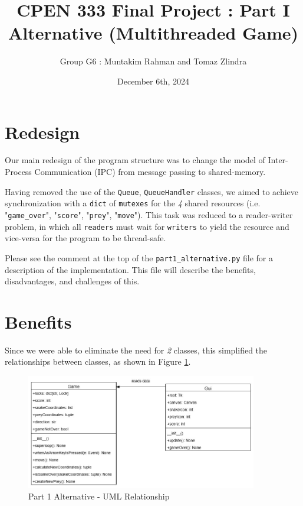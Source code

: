 \documentclass{article}
\title{CPEN 333 Final Project : Part I Alternative (Multithreaded Game)}
\author{Group G6 : Muntakim Rahman and Tomaz Zlindra}
\date{December 6th, 2024}
\begin{document}
\maketitle

\section{Redesign}
Our main redesign of the program structure was to change the model of Inter-Process Communication (IPC) from message passing to shared-memory.

Having removed the use of the \texttt{Queue}, \texttt{QueueHandler} classes, we aimed to achieve synchronization with a \texttt{dict} of \texttt{mutexes} for
the \textit{4} shared resources (i.e. "\texttt{game\_over}", "\texttt{score}", "\texttt{prey}", "\texttt{move}"). This task was reduced to a reader-writer problem, in which all \texttt{readers}
must wait for \texttt{writers} to yield the resource and vice-versa for the program to be thread-safe.

Please see the comment at the top of the \texttt{part1\_alternative.py} file for a description of the implementation. This file will describe the benefits, disadvantages, and challenges of this.

\section{Benefits}

Since we were able to eliminate the need for \textit{2} classes, this simplified the relationships between classes,
as shown in Figure \ref{fig:Part1_Alternative_ClassDiagrams}. \\

\begin{figure}[H]
    \centering
    \includegraphics[width=0.9\textwidth]{../Part_1_Alternative_ClassDiagrams.jpg}
    \caption{Part 1 Alternative - UML Relationship}
    \label{fig:Part1_Alternative_ClassDiagrams}
\end{figure}
\end{document}
